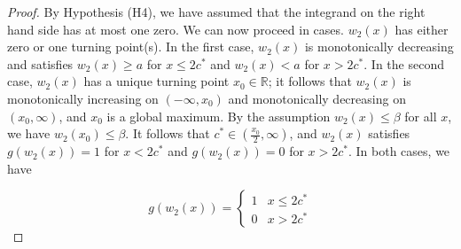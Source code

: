 \documentclass[11pt]{article}
\theoremstyle{definition}
\numberwithin{equation}{section}
\numberwithin{thm}{section}
\renewcommand{\a}{a}
\renewcommand{\b}{b}
\newcommand{\m}{n_1}
\begin{document}
\begin{proof}
By Hypothesis (H4), we have assumed that the integrand on the right hand side has at most one zero. We can now proceed in cases. $w_2(x)$ has either zero or one turning point(s). In the first case, $w_2(x)$ is monotonically decreasing and satisfies $w_2(x) \geq \a$ for $x \leq 2c^*$ and $w_2(x) < \a$ for $x > 2c^*$. In the second case, $w_2(x)$ has a unique turning point $x_0 \in \mathbb R$; it follows that $w_2(x)$ is monotonically increasing on $(-\infty,x_0)$ and monotonically decreasing on $(x_0,\infty)$, and $x_0$ is a global maximum. By the assumption $w_2(x)\leq\beta$ for all $x$, we have $w_2(x_0)\leq\beta$. It follows that $c^* \in (\frac{x_0}{2},\infty)$, and $w_2(x)$ satisfies $g(w_2(x))=1$ for $x<2c^*$ and $g(w_2(x)) = 0$ for $x>2c^*$. In both cases, we have

\begin{equation}
g(w_2(x)) = \begin{cases}
1 & x \leq 2c^* \\
0 & x > 2c^*
\end{cases}
\end{equation}


%


\end{proof}
\end{document}
